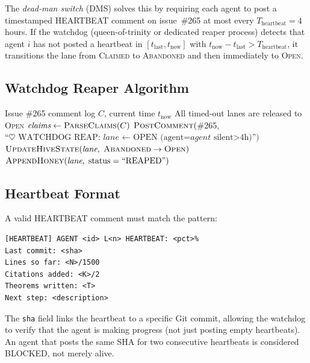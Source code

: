 The \emph{dead-man switch} (DMS) solves this by requiring each agent to
post a timestamped HEARTBEAT comment on issue~\#265 at most every
$T_{\text{heartbeat}} = 4$ hours. If the watchdog (queen-of-trinity or
dedicated reaper process) detects that agent $i$ has not posted a
heartbeat in $[t_{\text{last}}, t_{\text{now}}]$ with
$t_{\text{now}} - t_{\text{last}} > T_{\text{heartbeat}}$, it
transitions the lane from \textsc{Claimed} to \textsc{Abandoned} and
then immediately to \textsc{Open}.

\subsection{Watchdog Reaper Algorithm}
\label{ssec:K-watchdog}

\begin{algorithm}
\caption{Watchdog Reaper (executed by queen every $T_{\text{watchdog}}$ = 1~h)}
\label{alg:K-watchdog}
\begin{algorithmic}[1]
\Require Issue \#265 comment log $C$, current time $t_{\text{now}}$
\Ensure All timed-out lanes are released to \textsc{Open}
\State $\textit{claims} \gets \textsc{ParseClaims}(C)$
    \State $\textsc{PostComment}($\#265,
      $\text{``}\heartsuit\text{ WATCHDOG REAP: }
      \textit{lane}\text{ ← OPEN (agent=}\textit{agent}\text{ silent>4h)''})$
    \State $\textsc{UpdateHiveState}(\textit{lane},\;
      \textsc{Abandoned} \to \textsc{Open})$
    \State $\textsc{AppendHoney}(\textit{lane},\; \text{status}=\text{``REAPED''})$
  \EndIf
\EndFor
\end{algorithmic}
\end{algorithm}

\subsection{Heartbeat Format}
\label{ssec:K-heartbeat-format}

A valid HEARTBEAT comment must match the pattern:
\begin{verbatim}
[HEARTBEAT] AGENT <id> L<n> HEARTBEAT: <pct>%
Last commit: <sha>
Lines so far: <N>/1500
Citations added: <K>/2
Theorems written: <T>
Next step: <description>
\end{verbatim}
The \texttt{sha} field links the heartbeat to a specific Git commit,
allowing the watchdog to verify that the agent is making progress (not
just posting empty heartbeats). An agent that posts the same SHA for
two consecutive heartbeats is considered BLOCKED, not merely alive.

